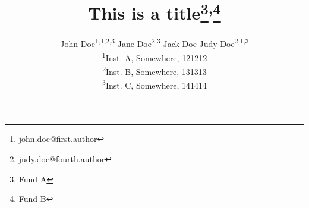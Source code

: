 \title{This is a title\thanks{Fund A}\textsuperscript{,}\thanks{Fund B}}
\author{John Doe\thanks{john.doe@first.author}\textsuperscript{,1,2,3}
Jane Doe\textsuperscript{2,3}
Jack Doe
Judy Doe\thanks{judy.doe@fourth.author}\textsuperscript{,1,3}\\
\textsuperscript{1}Inst. A, Somewhere, 121212\\
\textsuperscript{2}Inst. B, Somewhere, 131313\\
\textsuperscript{3}Inst. C, Somewhere, 141414}